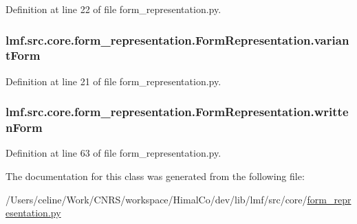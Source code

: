 Definition at line 22 of file form\+\_\+representation.\+py.

\hypertarget{classlmf_1_1src_1_1core_1_1form__representation_1_1_form_representation_ab271a76ed31e46ce4c1e66fad2651a73}{
\subsubsection[{variant\+Form}]{\setlength{\rightskip}{0pt plus 5cm}lmf.\+src.\+core.\+form\+\_\+representation.\+Form\+Representation.\+variant\+Form}}\label{classlmf_1_1src_1_1core_1_1form__representation_1_1_form_representation_ab271a76ed31e46ce4c1e66fad2651a73}


Definition at line 21 of file form\+\_\+representation.\+py.

\hypertarget{classlmf_1_1src_1_1core_1_1form__representation_1_1_form_representation_afb69cf4be897056fc27b9fa092692d06}{
\subsubsection[{written\+Form}]{\setlength{\rightskip}{0pt plus 5cm}lmf.\+src.\+core.\+form\+\_\+representation.\+Form\+Representation.\+written\+Form}}\label{classlmf_1_1src_1_1core_1_1form__representation_1_1_form_representation_afb69cf4be897056fc27b9fa092692d06}


Definition at line 63 of file form\+\_\+representation.\+py.



The documentation for this class was generated from the following file\+:\begin{DoxyCompactItemize}
\item 
/\+Users/celine/\+Work/\+C\+N\+R\+S/workspace/\+Himal\+Co/dev/lib/lmf/src/core/\hyperlink{form__representation_8py}{form\+\_\+representation.\+py}\end{DoxyCompactItemize}
